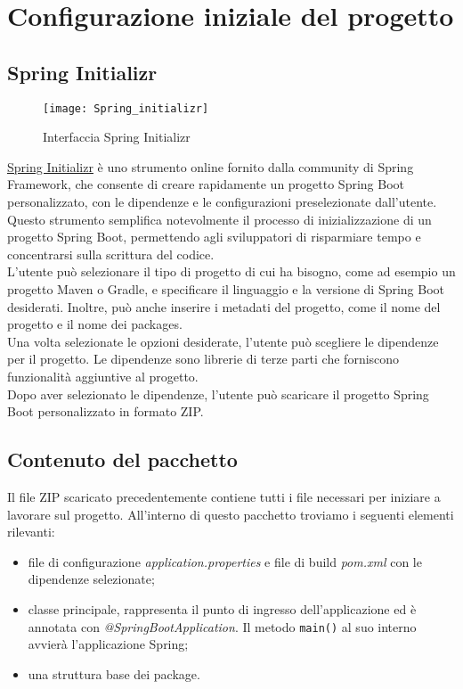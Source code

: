 \section{Configurazione iniziale del progetto}
\subsection{Spring Initializr}

\begin{figure}[!h] 
    \centering 
    \texttt{[image: Spring\_initializr]} 
    \caption{Interfaccia Spring Initializr}
\end{figure}

\noindent \href{https://start.spring.io/}{Spring Initializr} è uno strumento online fornito dalla community di Spring Framework, che consente di creare rapidamente un progetto Spring Boot personalizzato, con le dipendenze e le configurazioni preselezionate dall'utente. Questo strumento semplifica notevolmente il processo di inizializzazione di un progetto Spring Boot, permettendo agli sviluppatori di risparmiare tempo e concentrarsi sulla scrittura del codice.\\
L'utente può selezionare il tipo di progetto di cui ha bisogno, come ad esempio un progetto Maven o Gradle, e specificare il linguaggio e la versione di Spring Boot desiderati. Inoltre, può anche inserire i metadati del progetto, come il nome del progetto e il nome dei packages.\\
Una volta selezionate le opzioni desiderate, l'utente può scegliere le dipendenze per il progetto. Le dipendenze sono librerie di terze parti che forniscono funzionalità aggiuntive al progetto.\\
Dopo aver selezionato le dipendenze, l'utente può scaricare il progetto Spring Boot personalizzato in formato ZIP. 

\subsection{Contenuto del pacchetto}
Il file ZIP scaricato precedentemente contiene tutti i file necessari per iniziare a lavorare sul progetto. All'interno di questo pacchetto troviamo i seguenti elementi rilevanti:
\begin{itemize}
\item file di configurazione \textit{application.properties} e file di build \textit{pom.xml} con le dipendenze selezionate;
\item classe principale, rappresenta il punto di ingresso dell'applicazione ed è annotata con \textit{@SpringBootApplication}. Il metodo \texttt{main()} al suo interno avvierà l'applicazione Spring;
\item una struttura base dei package.
\end{itemize}
